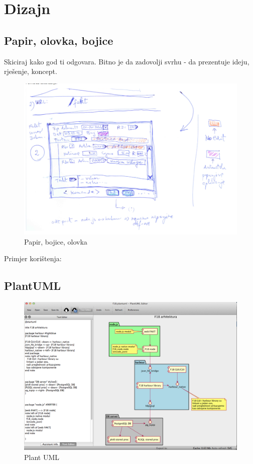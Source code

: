 \documentclass[times, utf8, seminar]{fit}
\begin{document}
\chapter{Dizajn}

\section{Papir, olovka, bojice}

Skiciraj kako god ti odgovara. Bitno je da zadovolji svrhu - da prezentuje ideju, rješenje, koncept.

\begin{figure}[H]
\centering
\includegraphics[width=14cm]{img/papir_i_olovka.png}
\caption{Papir, bojice, olovka}
\end{figure}

Primjer korištenja: \href{https://github.com/knowhow/F18_knowhow/wiki/F18-web-fakt}{\color{blue}{web FAKT UI prototip}}

\section{PlantUML}

\begin{figure}[H]
\centering
\includegraphics[width=14cm]{img/plantuml_f18.png}
\caption{Plant UML}
\end{figure}
\end{document}
